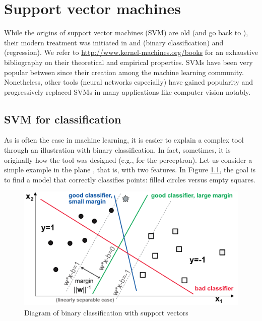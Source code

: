 \documentclass[]{krantz}
\theoremstyle{definition}
\theoremstyle{definition}
\theoremstyle{definition}
\theoremstyle{remark}
\begin{document}
\hypertarget{svm}{%
\chapter{Support vector machines}\label{svm}}

While the origins of support vector machines (SVM) are old (and go back
to \citet{vapnik1963pattern}), their modern treatment was initiated in
\citet{boser1992training} and \citet{cortes1995support} (binary
classification) and \citet{drucker1997support} (regression). We refer to
\url{http://www.kernel-machines.org/books} for an exhaustive
bibliography on their theoretical and empirical properties. SVMs have
been very popular between since their creation among the machine
learning community. Nonetheless, other tools (neural networks
especially) have gained popularity and progressively replaced SVMs in
many applications like computer vision notably.

\hypertarget{svm-for-classification}{%
\section{SVM for classification}\label{svm-for-classification}}

As is often the case in machine learning, it is easier to explain a
complex tool through an illustration with binary classification. In
fact, sometimes, it is originally how the tool was designed (e.g., for
the perceptron). Let us consider a simple example in the plane , that
is, with two features. In Figure \ref{fig:svmscheme}, the goal is to
find a model that correctly classifies points: filled circles versus
empty squares.

\begin{figure}[b]

{\centering \includegraphics[width=500px]{images/svm} 

}

\caption{Diagram of binary classification with support vectors}\label{fig:svmscheme}
\end{figure}
\end{document}
